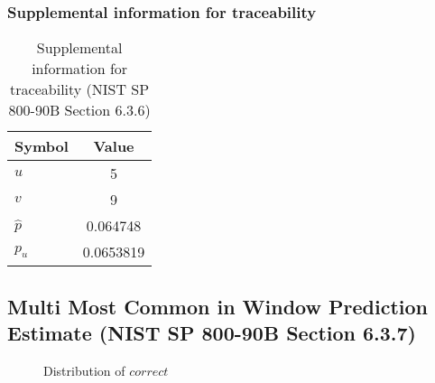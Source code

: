 \documentclass[a3paper,xelatex,english]{bxjsarticle}
\begin{document}
\subsubsection{Supplemental information for traceability}
\renewcommand{\arraystretch}{1.8}
\begin{table}[h]
\caption{Supplemental information for traceability (NIST SP 800-90B Section 6.3.6)}
\begin{center}
\begin{tabular}{|l|c|}
\hline 
\rowcolor{anotherlightblue} %
Symbol				& Value \\ \hline 
$u$				&        5\\ \hline 
$v$				&        9\\ \hline 
$\hat{p}$ 			& 0.064748\\ \hline
$p_u$				& 0.0653819\\ \hline
\end{tabular}
\end{center}
\end{table}
\renewcommand{\arraystretch}{1.4}
\clearpage
\subsection{Multi Most Common in Window Prediction Estimate (NIST SP 800-90B Section 6.3.7)}
\begin{figure}[htbp]
\caption{Distribution of $correct$}
\end{figure}
\end{document}
